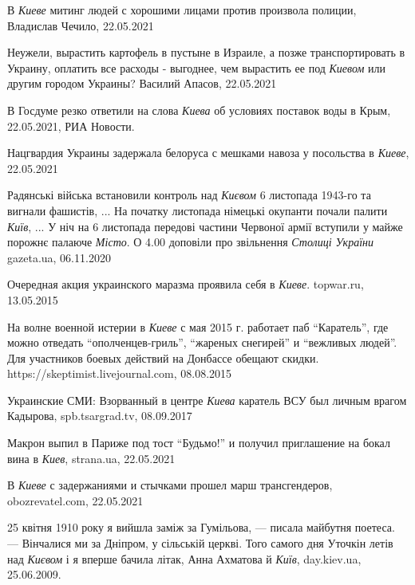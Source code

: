  
 
 
 
 

В \emph{Киеве} митинг людей с хорошими лицами против произвола полиции,
Владислав Чечило, 22.05.2021

Неужели, вырастить картофель в пустыне в Израиле, а позже транспортировать в
Украину, оплатить все расходы - выгоднее, чем вырастить ее под \emph{Киевом}
или другим городом Украины? Василий Апасов, 22.05.2021

В Госдуме резко ответили на слова \emph{Киева} об условиях поставок воды в
Крым, 22.05.2021, РИА Новости.

Нацгвардия Украины задержала белоруса с мешками навоза у посольства в
\emph{Киеве}, 22.05.2021

Радянські війська встановили контроль над \emph{Києвом} 6 листопада 1943-го та
вигнали фашистів, ... На початку листопада німецькі окупанти почали палити
\emph{Київ}, ... У ніч на 6 листопада передові частини Червоної армії вступили
у майже порожнє палаюче \emph{Місто}. О 4.00 доповіли про звільнення
\emph{Столиці України} gazeta.ua, 06.11.2020

Очередная акция украинского маразма проявила себя в \emph{Киеве}. topwar.ru,
13.05.2015

На волне военной истерии в \emph{Киеве} с мая 2015 г. работает паб
\enquote{Каратель}, где можно отведать \enquote{ополченцев-гриль},
\enquote{жареных снегирей} и \enquote{вежливых людей}.  Для участников боевых
действий на Донбассе обещают скидки.  https://skeptimist.livejournal.com,
08.08.2015

Украинские СМИ: Взорванный в центре \emph{Киева} каратель ВСУ был личным врагом
Кадырова, spb.tsargrad.tv, 08.09.2017

Макрон выпил в Париже под тост \enquote{Будьмо!} и получил приглашение на бокал вина в \emph{Киев},
strana.ua, 22.05.2021

В \emph{Киеве} с задержаниями и стычками прошел марш трансгендеров, obozrevatel.com, 22.05.2021

25 квітня 1910 року я вийшла заміж за Гумільова, — писала майбутня поетеса. —
Вінчалися ми за Дніпром, у сільській церкві. Того самого дня Уточкін летів над
\emph{Києвом} і я вперше бачила літак, Анна Ахматова й \emph{Київ},
day.kiev.ua, 25.06.2009.

